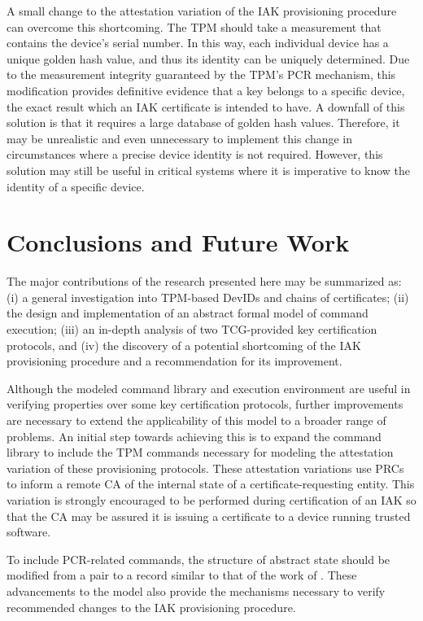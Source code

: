 \documentclass[runningheads]{llncs}
\begin{document}
A small change to the attestation variation of the IAK provisioning
procedure can overcome this shortcoming. The TPM should take a
measurement that contains the device's serial number. In this way,
each individual device has a unique golden hash value, and thus its
identity can be uniquely determined.  Due to the measurement integrity
guaranteed by the TPM's PCR mechanism, this modification provides
definitive evidence that a key belongs to a specific device, the exact
result which an IAK certificate is intended to have. A downfall of
this solution is that it requires a large database of golden hash
values. Therefore, it may be unrealistic and even unnecessary to
implement this change in circumstances where a precise device identity
is not required. However, this solution may still be useful in
critical systems where it is imperative to know the identity of a
specific device.
%
%
%
\section{Conclusions and Future Work}

The major contributions of the research presented here may be
summarized as: (i) a general investigation into TPM-based DevIDs and
chains of certificates; (ii) the design and implementation of an
abstract formal model of command execution; (iii) an in-depth analysis
of two TCG-provided key certification protocols, and (iv) the
discovery of a potential shortcoming of the IAK provisioning procedure
and a recommendation for its improvement.

Although the modeled command library and execution environment are
useful in verifying properties over some key certification protocols,
further improvements are necessary to extend the applicability of this
model to a broader range of problems. An initial step towards
achieving this is to expand the command library to include the TPM
commands necessary for modeling the attestation variation of these
provisioning protocols. These attestation variations use PRCs to
inform a remote CA of the internal state of a certificate-requesting
entity. This variation is strongly encouraged to be performed during
certification of an IAK so that the CA may be assured it is issuing a
certificate to a device running trusted software.

To include PCR-related commands, the structure of abstract state
should be modified from a pair to a record similar to that of the work
of \citet{PrivacyCAAnalysis-Hall}. These advancements to the model
also provide the mechanisms necessary to verify recommended changes to
the IAK provisioning procedure.
\end{document}

